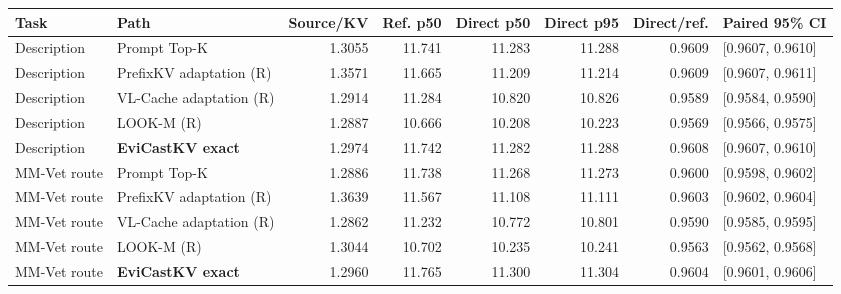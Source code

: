 \begin{tabular}{llrrrrrl}
\toprule
Task & Path & Source/KV & Ref. p50 & Direct p50 & Direct p95 & Direct/ref. & Paired 95\% CI\\\midrule
Description & Prompt Top-K & 1.3055 & 11.741 & 11.283 & 11.288 & 0.9609 & [0.9607, 0.9610]\\
Description & PrefixKV adaptation (R) & 1.3571 & 11.665 & 11.209 & 11.214 & 0.9609 & [0.9607, 0.9611]\\
Description & VL-Cache adaptation (R) & 1.2914 & 11.284 & 10.820 & 10.826 & 0.9589 & [0.9584, 0.9590]\\
Description & LOOK-M (R) & 1.2887 & 10.666 & 10.208 & 10.223 & 0.9569 & [0.9566, 0.9575]\\
Description & \textbf{EviCastKV exact} & 1.2974 & 11.742 & 11.282 & 11.288 & 0.9608 & [0.9607, 0.9610]\\
MM-Vet route & Prompt Top-K & 1.2886 & 11.738 & 11.268 & 11.273 & 0.9600 & [0.9598, 0.9602]\\
MM-Vet route & PrefixKV adaptation (R) & 1.3639 & 11.567 & 11.108 & 11.111 & 0.9603 & [0.9602, 0.9604]\\
MM-Vet route & VL-Cache adaptation (R) & 1.2862 & 11.232 & 10.772 & 10.801 & 0.9590 & [0.9585, 0.9595]\\
MM-Vet route & LOOK-M (R) & 1.3044 & 10.702 & 10.235 & 10.241 & 0.9563 & [0.9562, 0.9568]\\
MM-Vet route & \textbf{EviCastKV exact} & 1.2960 & 11.765 & 11.300 & 11.304 & 0.9604 & [0.9601, 0.9606]\\
\bottomrule
\end{tabular}
